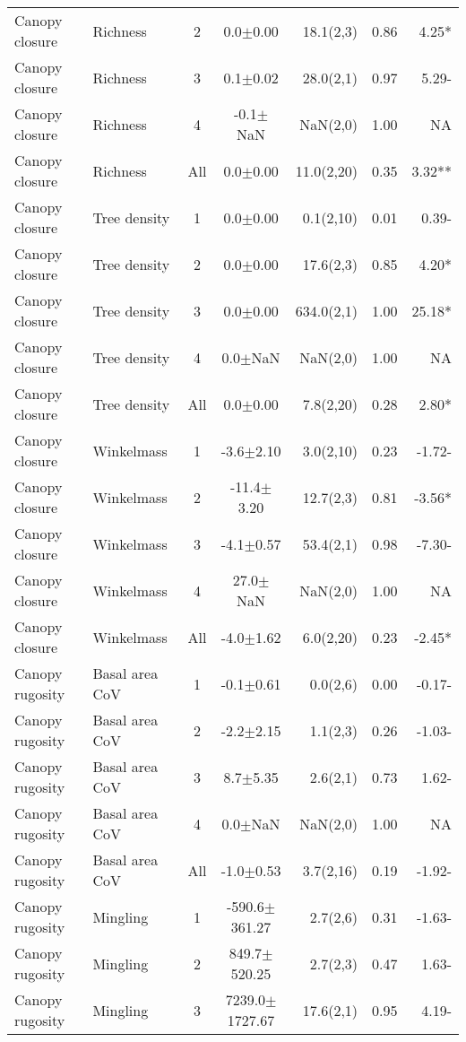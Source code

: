 \begin{longtable}{llcS[table-format=5.1(4.2)]rS[table-format=1.2]r}
  Canopy closure & Richness & 2 & 0.0$\pm$0.00 & 18.1(2,3) & 0.86 & 4.25* \\ 
  Canopy closure & Richness & 3 & 0.1$\pm$0.02 & 28.0(2,1) & 0.97 & 5.29- \\ 
  Canopy closure & Richness & 4 & -0.1$\pm$NaN & NaN(2,0) & 1.00 & NA \\ 
  Canopy closure & Richness & All & 0.0$\pm$0.00 & 11.0(2,20) & 0.35 & 3.32** \\ 
   \midrule
Canopy closure & Tree density & 1 & 0.0$\pm$0.00 & 0.1(2,10) & 0.01 & 0.39- \\ 
  Canopy closure & Tree density & 2 & 0.0$\pm$0.00 & 17.6(2,3) & 0.85 & 4.20* \\ 
  Canopy closure & Tree density & 3 & 0.0$\pm$0.00 & 634.0(2,1) & 1.00 & 25.18* \\ 
  Canopy closure & Tree density & 4 & 0.0$\pm$NaN & NaN(2,0) & 1.00 & NA \\ 
  Canopy closure & Tree density & All & 0.0$\pm$0.00 & 7.8(2,20) & 0.28 & 2.80* \\ 
   \midrule
Canopy closure & Winkelmass & 1 & -3.6$\pm$2.10 & 3.0(2,10) & 0.23 & -1.72- \\ 
  Canopy closure & Winkelmass & 2 & -11.4$\pm$3.20 & 12.7(2,3) & 0.81 & -3.56* \\ 
  Canopy closure & Winkelmass & 3 & -4.1$\pm$0.57 & 53.4(2,1) & 0.98 & -7.30- \\ 
  Canopy closure & Winkelmass & 4 & 27.0$\pm$NaN & NaN(2,0) & 1.00 & NA \\ 
  Canopy closure & Winkelmass & All & -4.0$\pm$1.62 & 6.0(2,20) & 0.23 & -2.45* \\ 
   \midrule
Canopy rugosity & Basal area CoV & 1 & -0.1$\pm$0.61 & 0.0(2,6) & 0.00 & -0.17- \\ 
  Canopy rugosity & Basal area CoV & 2 & -2.2$\pm$2.15 & 1.1(2,3) & 0.26 & -1.03- \\ 
  Canopy rugosity & Basal area CoV & 3 & 8.7$\pm$5.35 & 2.6(2,1) & 0.73 & 1.62- \\ 
  Canopy rugosity & Basal area CoV & 4 & 0.0$\pm$NaN & NaN(2,0) & 1.00 & NA \\ 
  Canopy rugosity & Basal area CoV & All & -1.0$\pm$0.53 & 3.7(2,16) & 0.19 & -1.92- \\ 
   \midrule
Canopy rugosity & Mingling & 1 & -590.6$\pm$361.27 & 2.7(2,6) & 0.31 & -1.63- \\ 
  Canopy rugosity & Mingling & 2 & 849.7$\pm$520.25 & 2.7(2,3) & 0.47 & 1.63- \\ 
  Canopy rugosity & Mingling & 3 & 7239.0$\pm$1727.67 & 17.6(2,1) & 0.95 & 4.19- \\ 

\end{longtable}
